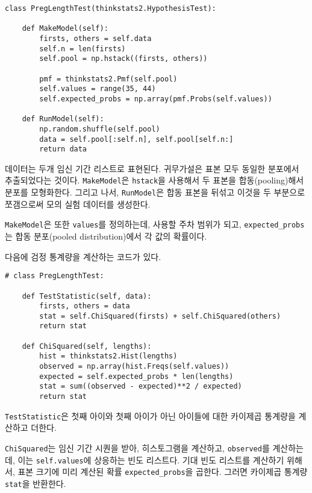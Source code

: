 
\begin{verbatim}
class PregLengthTest(thinkstats2.HypothesisTest):

    def MakeModel(self):
        firsts, others = self.data
        self.n = len(firsts)
        self.pool = np.hstack((firsts, others))

        pmf = thinkstats2.Pmf(self.pool)
        self.values = range(35, 44)
        self.expected_probs = np.array(pmf.Probs(self.values))

    def RunModel(self):
        np.random.shuffle(self.pool)
        data = self.pool[:self.n], self.pool[self.n:]
        return data
\end{verbatim}

데이터는 두개 임신 기간 리스트로 표현된다. 귀무가설은
표본 모두 동일한 분포에서 추출되었다는 것이다.
{\tt MakeModel}은 {\tt hstack}을 사용해서 두 표본을 합동(pooling)해서 분포를 모형화한다. 그리고 나서, {\tt RunModel}은 합동 표본을 뒤섞고 이것을 두 부분으로 쪼갬으로써 모의 실험 데이터를 생성한다.

{\tt MakeModel}은 또한 {\tt values}를 정의하는데, 사용할 주차 범위가 되고, 
\verb"expected_probs"는 합동 분포(pooled distribution)에서 각 값의 확률이다.

다음에 검정 통계량을 계산하는 코드가 있다.

\begin{verbatim}
# class PregLengthTest:

    def TestStatistic(self, data):
        firsts, others = data
        stat = self.ChiSquared(firsts) + self.ChiSquared(others)
        return stat

    def ChiSquared(self, lengths):
        hist = thinkstats2.Hist(lengths)
        observed = np.array(hist.Freqs(self.values))
        expected = self.expected_probs * len(lengths)
        stat = sum((observed - expected)**2 / expected)
        return stat
\end{verbatim}

{\tt TestStatistic}은 첫째 아이와 첫째 아이가 아닌 아이들에 대한 카이제곱 통계량을 계산하고 더한다.

{\tt ChiSquared}는 임신 기간 시퀀을 받아, 히스토그램을 계산하고,
{\tt observed}를 계산하는데, 이는 {\tt self.values}에 상응하는 빈도 리스트다. 기대 빈도 리스트를 계산하기 위해서, 표본 크기에 미리 계산된 확률 \verb"expected_probs"을 곱한다. 그러면 카이제곱 통계량 {\tt stat}을 반환한다.

